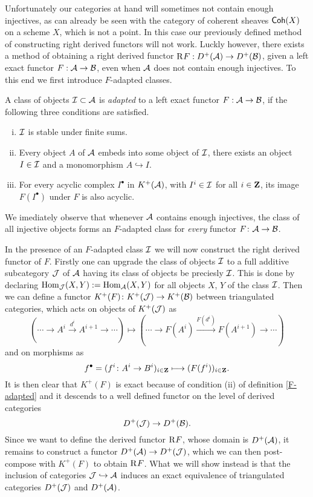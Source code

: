 Unfortunately our categories at hand will sometimes not contain enough injectives, as can already be seen with the category of coherent sheaves $\textsf{Coh}(X)$ on a scheme $X$, which is not a point. In this case our previously defined method of constructing right derived functors will not work. Luckly however, there exists a method of obtaining a right derived functor $\text{R}^{}F : D^+(\mathcal A) \to D^+(\mathcal B)$, given a left exact functor $F: \mathcal A \to \mathcal B$, even when $\mathcal A$ does not contain enough injectives. To this end we first introduce $F$-adapted classes.

\begin{definition}
    \label{F-adapted}
    A class of objects $\mathcal I \subset \mathcal A$ is \emph{adapted} to a left exact functor $F : \mathcal A \to \mathcal B$, if the following three conditions are satisfied.
    \begin{enumerate}[(i)]
        \item $\mathcal I$ is stable under finite sums. 
        \item Every object $A$ of $\mathcal A$ embeds into some object of $\mathcal I$, \ie there exists an object $I \in \mathcal I$ and a monomorphism $A \hookrightarrow I$.
        \item For every acyclic complex $I^\bullet$ in $K^+(\mathcal A)$, with $I^i \in \mathcal I$ for all $i \in \mathbf Z$, its image $F(I^\bullet)$ under $F$ is also acyclic.
    \end{enumerate}
\end{definition}

\begin{remark}
    We imediately observe that whenever $\mathcal A$ contains enough injectives, the class of all injective objects forms an $F$-adapted class for \emph{every} functor $F\colon \mathcal A \to \mathcal B$.
\end{remark}

In the presence of an $F$-adapted class $\mathcal I$ we will now construct the right derived functor of $F$. Firstly one can upgrade the class of objects $\mathcal I$ to a full additive subcategory $\mathcal J$ of $\mathcal A$ having its class of objects be preciesly $\mathcal I$. This is done by declaring $\operatorname{Hom}_\mathcal J(X, Y) := \operatorname{Hom}_\mathcal A(X, Y)$ for all objects $X$, $Y$ of the class $\mathcal I$. Then we can define a functor $K^+(F) \colon K^+(\mathcal J) \to K^+(\mathcal B)$ between triangulated categories, which acts on objects of $K^+(\mathcal J)$ as 
\[
    \left(\cdots \to A^i \xrightarrow{d^i} A^{i+1} \to \cdots\right) \longmapsto \left(\cdots \to F(A^i) \xrightarrow{F(d^i)} F(A^{i+1}) \to \cdots\right)
\]
and on morphisms as
\[
    f^\bullet = (f^i \colon A^i \to B^i)_{i \in \mathbf Z} \longmapsto (F(f^i))_{i \in \mathbf Z}.
\]
It is then clear that $K^+(F)$ is exact because of condition (ii) of definition \ref{F-adapted} and it descends to a well defined functor on the level of derived categories 
\[
    D^+(\mathcal J) \to D^+(\mathcal B).
\]
Since we want to define the derived functor $\text{R}^{}F$, whose domain is $D^+(\mathcal A)$, it remains to construct a functor $D^+(\mathcal A) \to D^+(\mathcal J)$, which we can then post-compose with $K^+(F)$ to obtain $\text{R}^{}F$. What we will show instead is that the inclusion of categories $\mathcal J \hookrightarrow \mathcal A$ induces an exact equivalence of triangulated categories $D^+(\mathcal J)$ and $D^+(\mathcal A)$.


